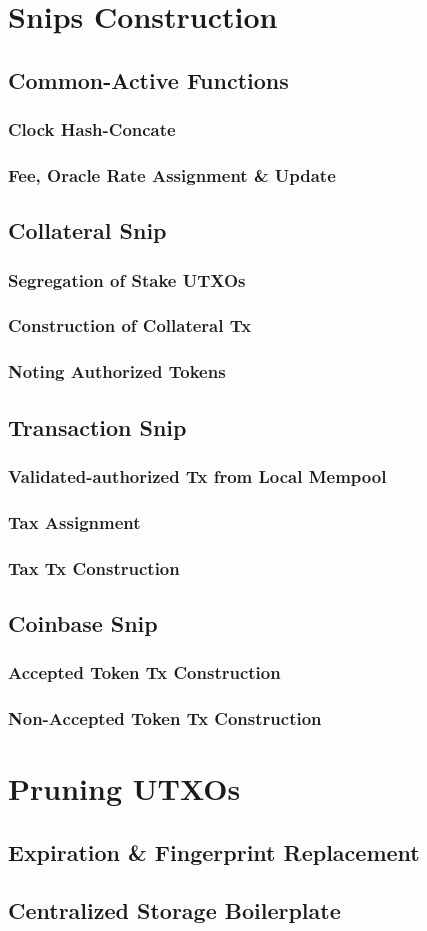 \documentclass[a4paper,11pt]{article}
\begin{document}
\section{Snips Construction}
\subsection{Common-Active Functions}
\subsubsection{Clock Hash-Concate}
\subsubsection{Fee, Oracle Rate Assignment \& Update}
\subsection{Collateral Snip}
\subsubsection{Segregation of Stake UTXOs}
\subsubsection{Construction of Collateral Tx}
\subsubsection{Noting Authorized Tokens}
\subsection{Transaction Snip}
\subsubsection{Validated-authorized Tx from Local Mempool}
\subsubsection{Tax Assignment}
\subsubsection{Tax Tx Construction}
\subsection{Coinbase Snip}
\subsubsection{Accepted Token Tx Construction}
\subsubsection{Non-Accepted Token Tx Construction}


\section{Pruning UTXOs}
\subsection{Expiration \& Fingerprint Replacement}
\subsection{Centralized Storage Boilerplate}
\end{document}
